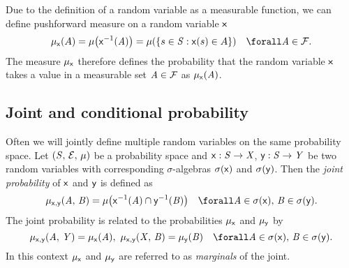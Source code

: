 Due to the definition of a random variable as a measurable function, we can define pushforward measure on a random variable $\mathsf{x}$
\begin{equation}
  \mu_{\rvar{x}}(A) 
  = \mu\lpa\rvar{x}^{-1}(\set{A})\rpa
  = \mu\lpa \lbr s \in \set{S}: \rvar{x}(s) \in A \rbr \rpa
  \quad \forall \set{A} \in \sset{F}.
\end{equation}
The measure $\mu_{\mathsf{x}}$ therefore defines the probability that the random variable $\mathsf{x}$ takes a value in a measurable set $\mathit{A} \in \mathcal{F}$ as $\mu_{\mathsf{x}}(\mathit{A})$.


\subsection{Joint and conditional probability}\label{subsec:joint-and-conditional-probabilities}

Often we will jointly define multiple random variables on the same probability space. Let $(\mathit{S},\,\mathcal{E},\,\mu)$ be a probability space and $\mathsf{x} : \mathit{S} \to \mathit{X}$, $\mathsf{y} : \mathit{S} \to \mathit{Y}$ be two random variables with corresponding $\sigma$-algebras $\sigma(\mathsf{x})$ and $\sigma(\mathsf{y})$. Then the \emph{joint probability} of $\mathsf{x}$ and $\mathsf{y}$ is defined as
\begin{equation}\label{eq:joint-probability-rvar}
  \mu_{\rvar{x},\rvar{y}}(\set{A},\,\set{B}) = 
  \mu\lpa \rvar{x}^{-1}(\set{A}) \cap \rvar{y}^{-1}(\set{B})\rpa
  \quad \forall \set{A} \in \sigma(\rvar{x}),\,\set{B} \in \sigma(\rvar{y}).
\end{equation}
The joint probability is related to the probabilities $\mu_{\mathsf{x}}$ and $\mu_{\mathsf{y}}$ by
\begin{equation}\label{eq:sum-rule-rvar}
  \mu_{\rvar{x},\rvar{y}}(\set{A},\,\set{Y}) =
  \mu_{\rvar{x}}(\set{A}),~
  \mu_{\rvar{x},\rvar{y}}(\set{X},\,\set{B}) =
  \mu_{\rvar{y}}(\set{B})
  \quad \forall \set{A} \in \sigma(\rvar{x}),\,\set{B} \in \sigma(\rvar{y}).
\end{equation}
In this context $\mu_{\mathsf{x}}$ and $\mu_{\mathsf{y}}$ are referred to as \emph{marginals} of the joint.


